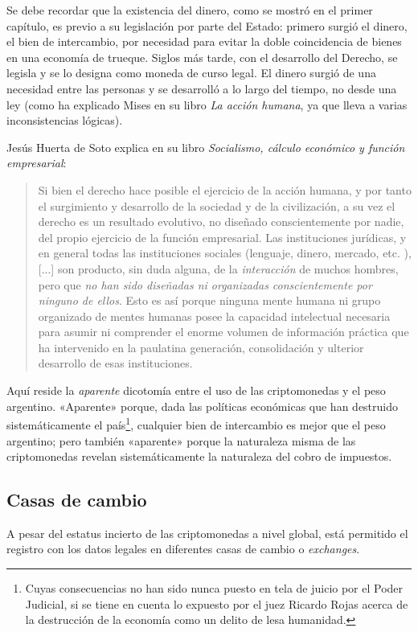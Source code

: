 \documentclass[12pt,a4paper,twoside]{book}
\begin{document}
Se debe recordar que la existencia del dinero, como se mostró en el primer capítulo, es previo a su legislación por parte del Estado: primero surgió el dinero, el bien de intercambio, por necesidad para evitar la doble coincidencia de bienes en una economía de trueque. Siglos más tarde, con el desarrollo del Derecho, se legisla y se lo designa como moneda de curso legal. El dinero surgió de una necesidad entre las personas y se desarrolló a lo largo del tiempo, no desde una ley (como ha explicado Mises en su libro \textit{La acción humana}, ya que lleva a varias inconsistencias lógicas).

Jesús Huerta de Soto explica en su libro \textit{Socialismo, cálculo económico y función empresarial}:

\begin{quotation}
Si bien el derecho hace posible el ejercicio de la acción humana, y por tanto el surgimiento y desarrollo de la sociedad y de la civilización, a su vez el derecho es un resultado evolutivo, no diseñado conscientemente por nadie, del propio ejercicio de la función empresarial. Las instituciones jurídicas, y en general todas las instituciones sociales (lenguaje, dinero, mercado, etc. ), [...] son producto, sin duda alguna, de la \textit{interacción} de muchos hombres, pero que \textit{no han sido diseñadas ni organizadas conscientemente por ninguno de ellos}. Esto es así porque ninguna mente humana ni grupo organizado de mentes humanas posee la capacidad intelectual necesaria para asumir ni comprender el enorme volumen de información práctica que ha intervenido en la paulatina generación, consolidación y ulterior desarrollo de esas instituciones. \cite[págs. 69-70]{huertasoto:socialismo}
\end{quotation}

Aquí reside la \textit{aparente} dicotomía entre el uso de las criptomonedas y el peso argentino. «Aparente» porque, dada las políticas económicas que han destruido sistemáticamente el país\footnote{Cuyas consecuencias no han sido nunca puesto en tela de juicio por el Poder Judicial, si se tiene en cuenta lo expuesto por el juez Ricardo Rojas acerca de la destrucción de la economía como un delito de lesa humanidad.}, cualquier bien de intercambio es mejor que el peso argentino; pero también «aparente» porque la naturaleza misma de las criptomonedas revelan sistemáticamente la naturaleza del cobro de impuestos.

\subsection{Casas de cambio}
A pesar del estatus incierto de las criptomonedas a nivel global, está permitido el registro con los datos legales en diferentes casas de cambio o \textit{exchanges}.
\end{document}
